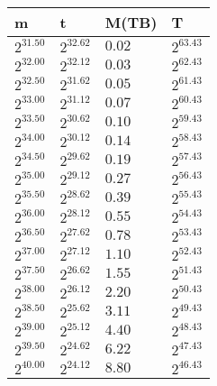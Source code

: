  \ 
\begin{tabular}{llll}
m & t & M(TB) & T \\ \hline
$2^{31.50}$ & $2^{32.62}$ & $0.02$ & $2^{63.43}$ \\
$2^{32.00}$ & $2^{32.12}$ & $0.03$ & $2^{62.43}$ \\
$2^{32.50}$ & $2^{31.62}$ & $0.05$ & $2^{61.43}$ \\
$2^{33.00}$ & $2^{31.12}$ & $0.07$ & $2^{60.43}$ \\
$2^{33.50}$ & $2^{30.62}$ & $0.10$ & $2^{59.43}$ \\
$2^{34.00}$ & $2^{30.12}$ & $0.14$ & $2^{58.43}$ \\
$2^{34.50}$ & $2^{29.62}$ & $0.19$ & $2^{57.43}$ \\
$2^{35.00}$ & $2^{29.12}$ & $0.27$ & $2^{56.43}$ \\
$2^{35.50}$ & $2^{28.62}$ & $0.39$ & $2^{55.43}$ \\
$2^{36.00}$ & $2^{28.12}$ & $0.55$ & $2^{54.43}$ \\
$2^{36.50}$ & $2^{27.62}$ & $0.78$ & $2^{53.43}$ \\
$2^{37.00}$ & $2^{27.12}$ & $1.10$ & $2^{52.43}$ \\
$2^{37.50}$ & $2^{26.62}$ & $1.55$ & $2^{51.43}$ \\
$2^{38.00}$ & $2^{26.12}$ & $2.20$ & $2^{50.43}$ \\
$2^{38.50}$ & $2^{25.62}$ & $3.11$ & $2^{49.43}$ \\
$2^{39.00}$ & $2^{25.12}$ & $4.40$ & $2^{48.43}$ \\
$2^{39.50}$ & $2^{24.62}$ & $6.22$ & $2^{47.43}$ \\
$2^{40.00}$ & $2^{24.12}$ & $8.80$ & $2^{46.43}$ \\
\end{tabular}
 \ 
